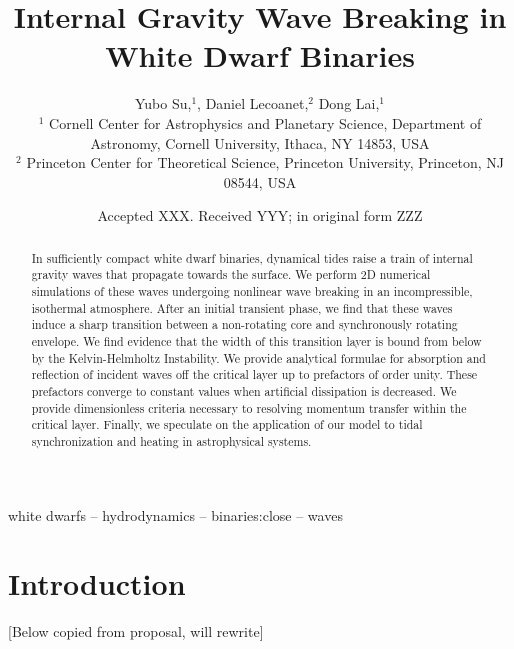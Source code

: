 \documentclass[
        fleqn,
        usenatbib,
    ]{mnras}
\title[Internal Gravity Wave Breaking in White Dwarf Binaries]{Internal Gravity Wave Breaking in White Dwarf Binaries}
\author[Y. Su et\ al.]{
Yubo Su,$^1$,
Daniel Lecoanet,$^2$
Dong Lai,$^1$
\\
$^1$ Cornell Center for Astrophysics and Planetary Science, Department of
Astronomy, Cornell University, Ithaca, NY 14853, USA
\\
$^2$ Princeton Center for Theoretical Science, Princeton University, Princeton,
NJ 08544, USA
}
\date{Accepted XXX\@. Received YYY\@; in original form ZZZ}
\begin{document}
\label{firstpage}
\pagerange{\pageref{firstpage}--\pageref{lastpage}}
\renewcommand*{\sectionautorefname}{Section}
\maketitle


\begin{abstract}
    In sufficiently compact white dwarf binaries, dynamical tides raise a train
    of internal gravity waves that propagate towards the surface. We perform 2D
    numerical simulations of these waves undergoing nonlinear wave breaking in
    an incompressible, isothermal atmosphere. After an initial transient phase,
    we find that these waves induce a sharp transition between a non-rotating
    core and synchronously rotating envelope. We find evidence that the width of
    this transition layer is bound from below by the Kelvin-Helmholtz
    Instability. We provide analytical formulae for absorption and reflection of
    incident waves off the critical layer up to prefactors of order unity. These
    prefactors converge to constant values when artificial dissipation is
    decreased. We provide dimensionless criteria necessary to resolving momentum
    transfer within the critical layer. Finally, we speculate on the application
    of our model to tidal synchronization and heating in astrophysical systems.
\end{abstract}

\begin{keywords}
white dwarfs -- hydrodynamics -- binaries:close -- waves %
\end{keywords}

\section{Introduction}

[Below copied from proposal, will rewrite]
\end{document}
